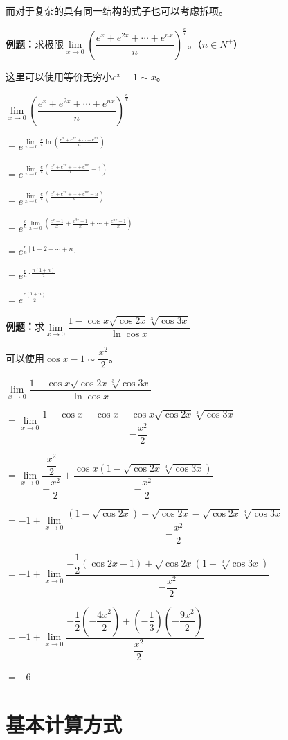 而对于复杂的具有同一结构的式子也可以考虑拆项。

\textbf{例题：}求极限$\lim\limits_{x\to 0}\left(\dfrac{e^x+e^{2x}+\cdots+e^{nx}}{n}\right)^{\frac{e}{x}}$。（$n\in N^+$）

这里可以使用等价无穷小$e^x-1\sim x$。

$\lim\limits_{x\to 0}\left(\dfrac{e^x+e^{2x}+\cdots+e^{nx}}{n}\right)^{\frac{e}{x}}$

$=e^{\lim\limits_{x\to 0}\frac{e}{x}\ln\left(\frac{e^x+e^{2x}+\cdots+e^{nx}}{n}\right)}$

$=e^{\lim\limits_{x\to 0}\frac{e}{x}\left(\frac{e^x+e^{2x}+\cdots+e^{nx}}{n}-1\right)}$

$=e^{\lim\limits_{x\to 0}\frac{e}{x}\left(\frac{e^x+e^{2x}+\cdots+e^{nx}-n}{n}\right)}$

$=e^{\frac{e}{n}\lim\limits_{x\to 0}\left(\frac{e^x-1}{x}+\frac{e^{2x}-1}{x}+\cdots+\frac{e^{nx}-1}{x}\right)}$

$=e^{\frac{e}{n}[1+2+\cdots+n]}$

$=e^{\frac{e}{n}\cdot\frac{n(1+n)}{2}}$

$=e^{\frac{e(1+n)}{2}}$

\textbf{例题：}求$\lim\limits_{x\to 0}\dfrac{1-\cos x\sqrt{\cos 2x}\sqrt[3]{\cos 3x}}{\ln\cos x}$\medskip

可以使用$\cos x-1\sim\dfrac{x^2}{2}$。\medskip

$\lim\limits_{x\to 0}\dfrac{1-\cos x\sqrt{\cos 2x}\sqrt[3]{\cos 3x}}{\ln\cos x}$

$=\lim\limits_{x\to 0}\dfrac{1-\cos x+\cos x-\cos x\sqrt{\cos 2x}\sqrt[3]{\cos 3x}}{-\dfrac{x^2}{2}}$

$=\lim\limits_{x\to 0}\dfrac{\dfrac{x^2}{2}}{-\dfrac{x^2}{2}}+\dfrac{\cos x(1-\sqrt{\cos 2x}\sqrt[3]{\cos 3x})}{-\dfrac{x^2}{2}}$

$=-1+\lim\limits_{x\to 0}\dfrac{(1-\sqrt{\cos 2x})+\sqrt{\cos 2x}-\sqrt{\cos 2x}\sqrt[3]{\cos 3x}}{-\dfrac{x^2}{2}}$

$=-1+\lim\limits_{x\to 0}\dfrac{-\dfrac{1}{2}(\cos 2x-1)+\sqrt{\cos 2x}(1-\sqrt[3]{\cos 3x})}{-\dfrac{x^2}{2}}$

$=-1+\lim\limits_{x\to 0}\dfrac{-\dfrac{1}{2}(-\dfrac{4x^2}{2})+\left(-\dfrac{1}{3}\right)\left(-\dfrac{9x^2}{2}\right)}{-\dfrac{x^2}{2}}$

$=-6$


\section{基本计算方式}

